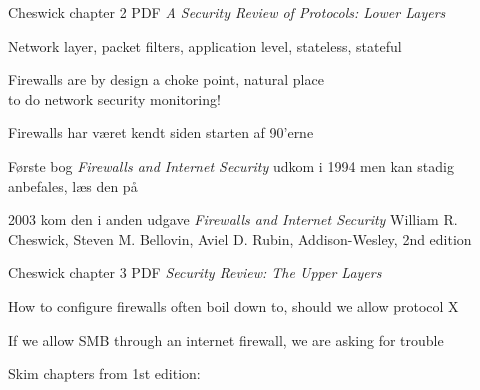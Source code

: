 \documentclass[Screen16to9,17pt]{foils}
\begin{document}
\begin{list1}
\item {}
\item {} Cheswick chapter 2 PDF
\emph{A Security Review of Protocols:
Lower Layers}
\begin{list2}
\item Network layer, packet filters, application level, stateless, stateful
\end{list2}
\end{list1}

\Large Firewalls are by design a choke point, natural place \\
to do network security monitoring!




\begin{list1}
\item Firewalls har været kendt siden starten af 90'erne
\item Første bog \emph{Firewalls and Internet Security} udkom i 1994 men kan stadig anbefales, læs den på 

\item 2003 kom den i anden udgave \emph{Firewalls and Internet Security}
William R. Cheswick, Steven M. Bellovin, Aviel D. Rubin,
Addison-Wesley, 2nd edition
\end{list1}




\begin{list1}
\item {} Cheswick chapter 3 PDF
\emph{Security Review: The Upper Layers}
\begin{list2}
\item How to configure firewalls often boil down to, should we allow protocol X
\item If we allow SMB through an internet firewall, we are asking for trouble
\end{list2}
\end{list1}

Skim chapters from 1st edition:\\
\\ 
\end{document}
